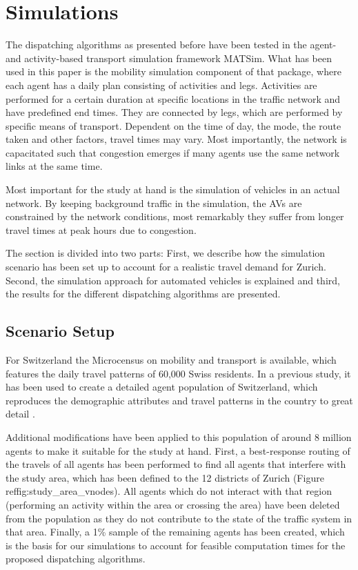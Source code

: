 \section{Simulations}
\label{sec:staticSimulations}

The dispatching algorithms as presented before have been tested in the agent- and activity-based transport simulation framework MATSim. What has been used in this paper is the mobility simulation component of that package, where each agent
has a daily plan consisting of activities and legs. Activities are performed for a certain duration at specific locations in the traffic network and have predefined end times. They are connected by legs, which are performed by specific means of transport. Dependent on the time of day, the mode, the route taken and other factors, travel times may vary. Most importantly, the network is capacitated such that congestion emerges if many agents use the same network links at the same time.

Most important for the study at hand is the simulation of vehicles in an actual network. By keeping background traffic in the simulation, the AVs are constrained by the network conditions, most remarkably they suffer from longer travel times at peak hours due to congestion.

The section is divided into two parts: First, we describe how the simulation scenario has been set up to account for a realistic travel demand for Zurich. Second, the simulation approach for automated vehicles is explained and third, the results for the different dispatching algorithms are presented.

\subsection{Scenario Setup}
\label{sec:simulations_scenario}

For Switzerland the Microcensus on mobility and transport \cite{microcensus} is available, which features the daily travel patterns of 60,000 Swiss residents. In a previous study, it has been used to create a detailed agent population of Switzerland, which reproduces the demographic attributes and travel patterns in the country to great detail \cite{ivtbaseline}.

Additional modifications have been applied to this population of around 8 million agents to make it suitable for the study at hand. First, a best-response routing of the travels of all agents has been performed to find all agents that interfere with the study area, which has been defined to the 12 districts of Zurich (Figure ref{fig:study_area_vnodes}).
All agents which do not interact with that region (performing an activity within the area or crossing the area) have been deleted from the population as they do not contribute to the state of the traffic system in that area. Finally, a 1\% sample of the remaining agents has been created, which is the basis for our simulations to account for feasible computation times for the proposed dispatching
algorithms.

